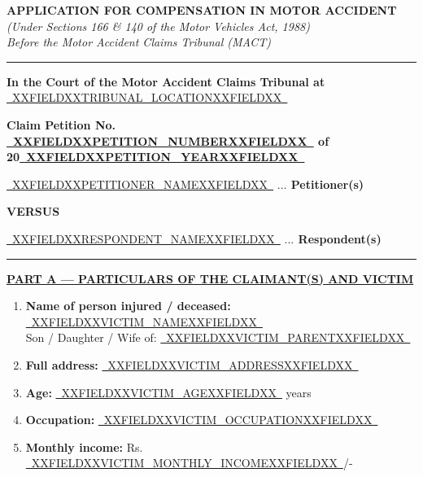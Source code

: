 \documentclass[12pt,a4paper]{article}
\newcommand{\fillline}[1]{\underline{~#1~}}
\begin{document}
\begin{center}
    {\LARGE\textbf{APPLICATION FOR COMPENSATION IN MOTOR ACCIDENT}}\\[0.5em]
    {\normalsize\textit{(Under Sections 166 \& 140 of the Motor Vehicles Act, 1988)}}\\[0.3em]
    {\normalsize\textit{Before the Motor Accident Claims Tribunal (MACT)}}\\[0.5em]
    \rule{\linewidth}{0.8pt}
\end{center}

\vspace{0.5em}

\noindent\textbf{In the Court of the Motor Accident Claims Tribunal at}
\fillline{XXFIELDXXTRIBUNAL_LOCATIONXXFIELDXX}

\vspace{1em}

\begin{center}
    \textbf{Claim Petition No. \fillline{XXFIELDXXPETITION_NUMBERXXFIELDXX} of 20\fillline{XXFIELDXXPETITION_YEARXXFIELDXX}}
\end{center}

\vspace{1em}

\noindent \fillline{XXFIELDXXPETITIONER_NAMEXXFIELDXX} \hfill \textbf{$\ldots$ Petitioner(s)}

\vspace{1em}
\begin{center}\textbf{VERSUS}\end{center}
\vspace{1em}

\noindent \fillline{XXFIELDXXRESPONDENT_NAMEXXFIELDXX} \hfill \textbf{$\ldots$ Respondent(s)}

\vspace{1em}
\rule{\linewidth}{0.8pt}

\noindent\textbf{\uline{PART A --- PARTICULARS OF THE CLAIMANT(S) AND VICTIM}}

\vspace{0.5em}

\begin{enumerate}[label=\textbf{\arabic*.}, leftmargin=2em, itemsep=0.6em]

    \item \textbf{Name of person injured / deceased:} \fillline{XXFIELDXXVICTIM_NAMEXXFIELDXX}\\
          Son / Daughter / Wife of: \fillline{XXFIELDXXVICTIM_PARENTXXFIELDXX}

    \item \textbf{Full address:} \fillline{XXFIELDXXVICTIM_ADDRESSXXFIELDXX}

    \item \textbf{Age:} \fillline{XXFIELDXXVICTIM_AGEXXFIELDXX} years

    \item \textbf{Occupation:} \fillline{XXFIELDXXVICTIM_OCCUPATIONXXFIELDXX}

    \item \textbf{Monthly income:} Rs. \fillline{XXFIELDXXVICTIM_MONTHLY_INCOMEXXFIELDXX}/-

\end{enumerate}
\end{document}

